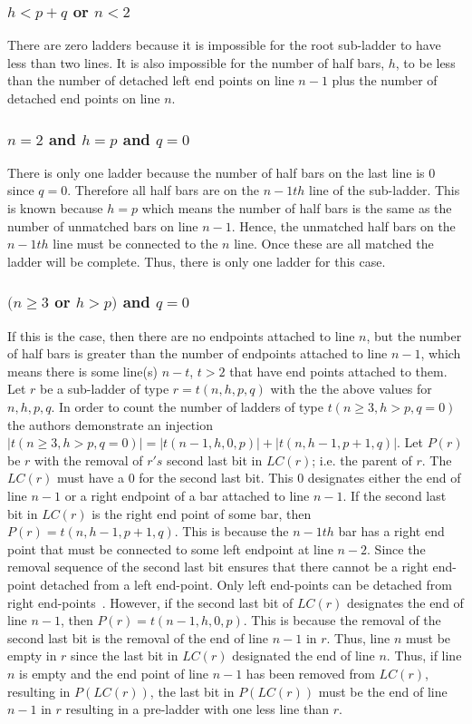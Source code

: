 \subsubsection{ $h < p+q$ or $n<2$}
There are zero ladders because it is impossible for the 
root sub-ladder to have less than two lines. It is also 
impossible for the number of half bars, $h$, to 
be less than the number of detached left end points 
on line $n-1$ plus the number of detached end points on 
line $n$.

\subsubsection{$n=2$ and $h=p$ and $q=0$}
There is only one ladder because the number of half bars 
on the last line is 0 since $q=0$. Therefore all half bars are on the 
$n-1th$ line of the sub-ladder. This is known because 
$h=p$ which means the number of half bars is the same as 
the number of unmatched bars on line $n-1$. Hence, the unmatched 
half bars on the $n-1th$ line must be connected to the $n$ 
line. Once these are all matched the ladder will be complete. 
Thus, there is only one ladder for this case.

\subsubsection{$(n \geq 3$ or $h>p)$ and $q=0$}
If this is the case, then there are no endpoints attached to 
line $n$, but the number of half bars is greater than the 
number of endpoints attached to line $n-1$, which means there is 
some line(s) $n-t$, $t>2$ that have end points attached to them.
Let $r$ be a sub-ladder of type $r=t(n,h,p,q)$
with the the above values for $n,h,p,q$. In order to count the number of ladders of type 
$t(n\geq3, h>p, q=0)$ the authors demonstrate an injection $|t(n\geq3, h>p, q=0)|=|t(n-1,h,0,p)| + |t(n,h-1,p+1,q)|$.\cite{A6}
Let $P(r)$ be $r$ with the removal of $r's$ second last bit in $LC(r)$; i.e. the parent of 
$r$.  The $LC(r)$ must have a $0$ for the second last bit. This $0$ designates either the 
end of line $n-1$ or a right endpoint of a bar attached to line $n-1$. 
If the second last bit in $LC(r)$ is the right end point of some 
bar, then $P(r)=t(n,h-1,p+1,q)$. This is because the $n-1th$ bar 
has a right end point that must be connected to some left  
endpoint at line $n-2$. Since the removal sequence of the second 
last bit ensures that there cannot be a right end-point detached 
from a left end-point. Only left end-points can be detached 
from right end-points~\cite{A6}. However, if the second last bit 
of $LC(r)$ designates the end of line $n-1$, then $P(r)=t(n-1,h,0,p)$. 
This is because the removal of the second last bit 
is the removal of the end of line $n-1$ in $r$. Thus, 
line $n$ must be empty in $r$ since the last bit in $LC(r)$
designated the end of line $n$. Thus, if line $n$ is empty 
and the end point of line $n-1$ has been removed from $LC(r)$, 
resulting in $P(LC(r))$, the last bit in $P(LC(r))$ must be 
the end of line $n-1$ in $r$ resulting in a pre-ladder with one 
less line than $r$.\par  

